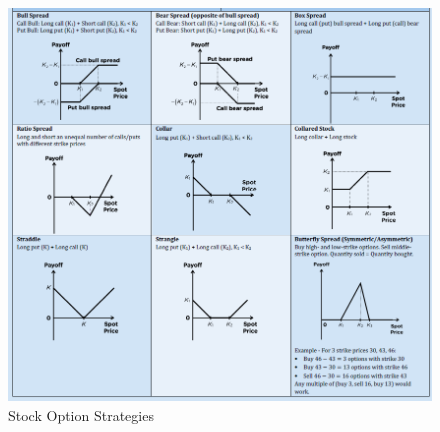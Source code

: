 \documentclass[11pt,fleqn]{book} %
\numberwithin{equation}{section} %
\numberwithin{figure}{section} %
\numberwithin{table}{section} %
\begin{document}
 \begin{center}
     \begin{figure}[h!]
         \centering
         \includegraphics[scale=0.65]{optionstrat.PNG}
         \caption{Stock Option Strategies}
     \end{figure}
 \end{center}
\end{document}
